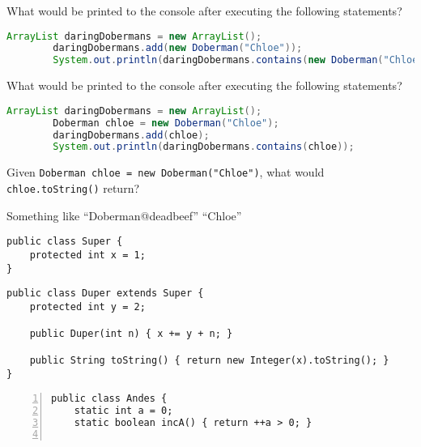 \documentclass[addpoints,9pt]{exam}
\begin{document}
\begin{questions}
\begin{choices}
\end{choices}

\question[3] What would be printed to the console after executing the following statements?
\begin{lstlisting}[language=Java]
        ArrayList daringDobermans = new ArrayList();
        daringDobermans.add(new Doberman("Chloe"));
        System.out.println(daringDobermans.contains(new Doberman("Chloe")));
\end{lstlisting}

\begin{choices}
\end{choices}

\question[3] What would be printed to the console after executing the following statements?
\begin{lstlisting}[language=Java]
        ArrayList daringDobermans = new ArrayList();
        Doberman chloe = new Doberman("Chloe");
        daringDobermans.add(chloe);
        System.out.println(daringDobermans.contains(chloe));
\end{lstlisting}

\begin{choices}
\end{choices}

\question[3] Given {\tt Doberman chloe = new Doberman("Chloe")}, what would {\tt chloe.toString()} return?

\begin{choices}
\correctchoice Something like ``Doberman@deadbeef''
\choice ``Chloe''
\end{choices}

\newpage

\begin{lstlisting}
public class Super {
    protected int x = 1;
}
\end{lstlisting}

\begin{lstlisting}
public class Duper extends Super {
    protected int y = 2;

    public Duper(int n) { x += y + n; }

    public String toString() { return new Integer(x).toString(); }
}
\end{lstlisting}

\begin{lstlisting}[numbers=left]
public class Andes {
    static int a = 0;
    static boolean incA() { return ++a > 0; }


\end{lstlisting}
\end{questions}
\end{document}

